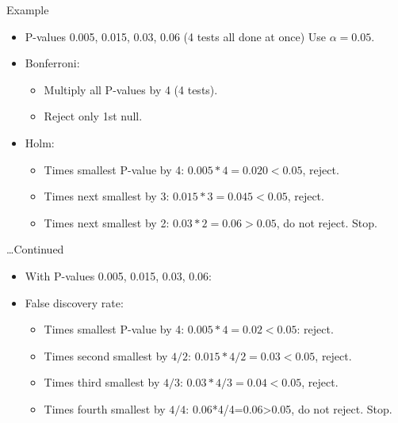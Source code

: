\documentclass[unknownkeysallowed]{beamer}\usepackage[]{graphicx}\usepackage[]{color}
\begin{document}
\begin{frame}[fragile]{Example}
  
  \begin{itemize}
  \item P-values 0.005, 0.015, 0.03, 0.06 (4 tests all done at once)
Use $\alpha=0.05$.

\item Bonferroni: 
  \begin{itemize}
  \item 
Multiply all P-values by 4 (4 tests).
\item 
Reject only 1st null.
  \end{itemize}

\item Holm: 
  \begin{itemize}
  \item 
Times smallest P-value by 4: $0.005*4=0.020<0.05$, reject.
\item 
Times next smallest by 3: $0.015*3=0.045<0.05$, reject.
\item Times next smallest by 2: $0.03*2=0.06>0.05$, do not reject. Stop.
  \end{itemize}

  \end{itemize}

\end{frame}

\begin{frame}[fragile]{\ldots Continued}
  
  
  \begin{itemize}
  \item   With P-values 0.005, 0.015, 0.03, 0.06:
\item False discovery rate:
  \begin{itemize}
  \item Times smallest P-value by 4: $0.005*4=0.02<0.05$: reject.
\item Times second smallest by $4/2$: $0.015*4/2=0.03<0.05$, reject.
\item Times third smallest by $4/3$: $0.03*4/3=0.04<0.05$, reject.
\item Times fourth smallest by $4/4$: 0.06*4/4=0.06>0.05, do not reject. Stop.
  \end{itemize}
  \end{itemize}
  
\end{frame}
\end{document}
